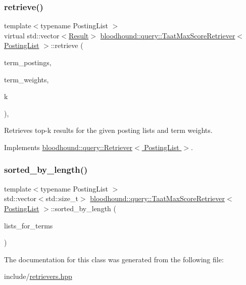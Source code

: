 \subsubsection{\texorpdfstring{retrieve()}{retrieve()}}
{\footnotesize\ttfamily template$<$typename Posting\+List $>$ \\
virtual std\+::vector$<$\hyperlink{structbloodhound_1_1query_1_1Result}{Result}$>$ \hyperlink{classbloodhound_1_1query_1_1TaatMaxScoreRetriever}{bloodhound\+::query\+::\+Taat\+Max\+Score\+Retriever}$<$ \hyperlink{classbloodhound_1_1PostingList}{Posting\+List} $>$\+::retrieve (\begin{DoxyParamCaption}\item[{const std\+::vector$<$ \hyperlink{classbloodhound_1_1PostingList}{Posting\+List} $>$ \&}]{term\+\_\+postings,  }\item[{const std\+::vector$<$ \hyperlink{structbloodhound_1_1Score}{Score} $>$ \&}]{term\+\_\+weights,  }\item[{std\+::size\+\_\+t}]{k }\end{DoxyParamCaption})\hspace{0.3cm}{\ttfamily [inline]}, {\ttfamily [virtual]}}



Retrieves top-\/k results for the given posting lists and term weights. 



Implements \hyperlink{classbloodhound_1_1query_1_1Retriever_ae3c6a4628c5580e620c213b3dcd47c2b}{bloodhound\+::query\+::\+Retriever$<$ Posting\+List $>$}.

\mbox{\label{classbloodhound_1_1query_1_1TaatMaxScoreRetriever_a4c5253dee6541cf173f4f2e16803c702}} 
\subsubsection{\texorpdfstring{sorted\+\_\+by\+\_\+length()}{sorted\_by\_length()}}
{\footnotesize\ttfamily template$<$typename Posting\+List $>$ \\
std\+::vector$<$std\+::size\+\_\+t$>$ \hyperlink{classbloodhound_1_1query_1_1TaatMaxScoreRetriever}{bloodhound\+::query\+::\+Taat\+Max\+Score\+Retriever}$<$ \hyperlink{classbloodhound_1_1PostingList}{Posting\+List} $>$\+::sorted\+\_\+by\+\_\+length (\begin{DoxyParamCaption}\item[{const std\+::vector$<$ \hyperlink{classbloodhound_1_1PostingList}{Posting\+List} $>$ \&}]{lists\+\_\+for\+\_\+terms }\end{DoxyParamCaption})\hspace{0.3cm}{\ttfamily [inline]}}



The documentation for this class was generated from the following file\+:\begin{DoxyCompactItemize}
\item 
include/\hyperlink{retrievers_8hpp}{retrievers.\+hpp}\end{DoxyCompactItemize}
